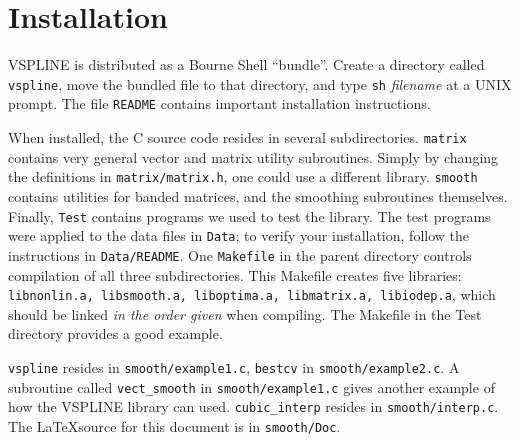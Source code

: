 
\section{Installation}
VSPLINE
is distributed as a Bourne Shell ``bundle''.
Create a directory called {\tt vspline},
move the bundled file to that directory,
and type {\tt sh} {\em filename} at a UNIX prompt.
The file {\tt README} contains important
installation instructions.

When installed,
the C source code resides in several subdirectories.
{\tt matrix} contains very general vector
and matrix utility subroutines.
Simply by changing the definitions in
{\tt matrix/matrix.h},
one could use a different library.
{\tt smooth}
contains utilities for banded matrices,
and the smoothing subroutines themselves.
Finally,
{\tt Test}
contains programs we used to test the library.
The test programs were applied to
the data files in {\tt Data};
to verify your installation,
follow the instructions in {\tt Data/README}.
One {\tt Makefile} in the parent directory
controls compilation of all three subdirectories.
This Makefile creates five libraries:
{\tt libnonlin.a, libsmooth.a,
liboptima.a, libmatrix.a, libiodep.a},
which should be linked {\em in the order given}
when compiling.
The Makefile in the Test directory provides a good
example.


{\tt vspline} resides in {\tt smooth/example1.c},
{\tt bestcv} in {\tt smooth/example2.c}.
A subroutine called {\tt vect\_smooth}
in {\tt smooth/example1.c}
gives another example of how the VSPLINE library can used.
{\tt cubic\_interp} resides in {\tt smooth/interp.c}.
The \LaTeX source for this document is in {\tt smooth/Doc}.

